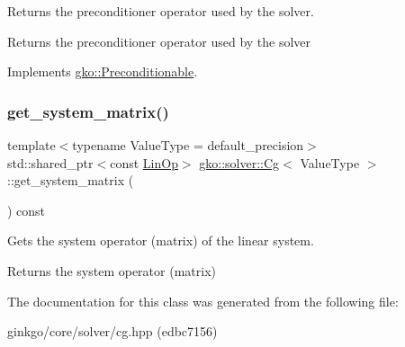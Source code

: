 Returns the preconditioner operator used by the solver. 

\begin{DoxyReturn}{Returns}
the preconditioner operator used by the solver 
\end{DoxyReturn}


Implements \hyperlink{classgko_1_1Preconditionable_ad9545089aef0dfc83bc7a74e5bf1d748}{gko\+::\+Preconditionable}.

\mbox{\label{classgko_1_1solver_1_1Cg_a09d50a99fdc668316757ee253386ad2a}} 
\subsubsection{\texorpdfstring{get\+\_\+system\+\_\+matrix()}{get\_system\_matrix()}}
{\footnotesize\ttfamily template$<$typename Value\+Type  = default\+\_\+precision$>$ \\
std\+::shared\+\_\+ptr$<$const \hyperlink{classgko_1_1LinOp}{Lin\+Op}$>$ \hyperlink{classgko_1_1solver_1_1Cg}{gko\+::solver\+::\+Cg}$<$ Value\+Type $>$\+::get\+\_\+system\+\_\+matrix (\begin{DoxyParamCaption}{ }\end{DoxyParamCaption}) const\hspace{0.3cm}{\ttfamily [inline]}}



Gets the system operator (matrix) of the linear system. 

\begin{DoxyReturn}{Returns}
the system operator (matrix) 
\end{DoxyReturn}


The documentation for this class was generated from the following file\+:\begin{DoxyCompactItemize}
\item 
ginkgo/core/solver/cg.\+hpp (edbc7156)\end{DoxyCompactItemize}

